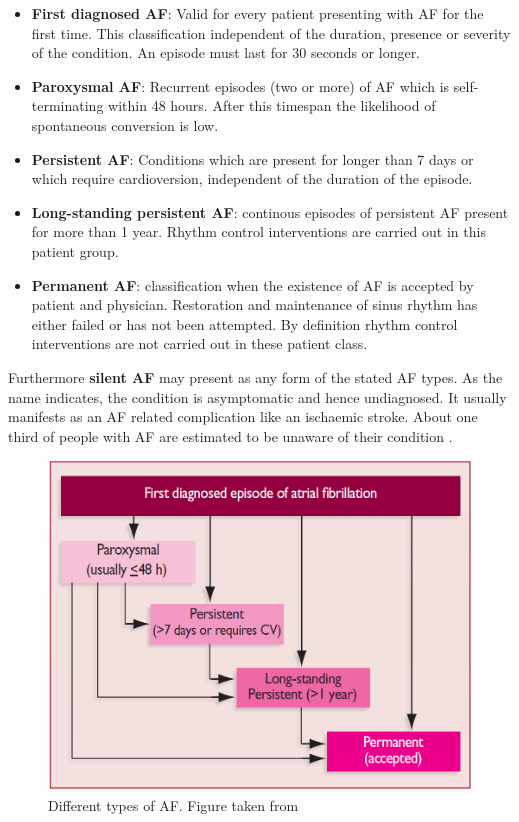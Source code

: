 \documentclass[type=dr, dr=rernat, accentcolor=tud7b,colorbacktitle, bigchapter, openright, twoside, 12pt ]{tudthesis}
\begin{document}
\begin{itemize} 
 \item[] \textbf{First diagnosed AF}: Valid for every patient presenting with AF for the first time. This classification independent of the 
 duration, presence or severity of the condition. An episode must last for 30 seconds or longer.
 \item[] \textbf{Paroxysmal AF}: Recurrent episodes (two or more) of AF which is self-terminating within 48 hours. After this timespan the 
 likelihood of spontaneous conversion is low.
 \item[] \textbf{Persistent AF}: Conditions which are present for longer than 7 days or which require cardioversion, independent of the 
 duration of the episode. 
 \item[] \textbf{Long-standing persistent AF}: continous episodes of persistent AF present for more than 1 year. Rhythm control 
 interventions  are carried out in this patient group. 
 \item[] \textbf{Permanent AF}: classification when the existence of AF is accepted by patient and physician. Restoration and maintenance
 of sinus rhythm has either failed or has not been attempted. By definition rhythm control interventions are not carried out in these 
 patient class.  
\end{itemize}

Furthermore \textbf{silent AF} may present as any form of the stated AF types. As the name indicates, the condition is asymptomatic and 
hence undiagnosed. It usually manifests as an AF related complication like an ischaemic stroke. About one third of people with AF are 
estimated to be unaware of their condition \cite{ESC10}.

\begin{figure}[H]
\begin{center}
\includegraphics[scale=0.25]{af_types.png}
\caption{Different types of AF. Figure taken from \cite{ESC10}}
\label{ecg}
\end{center}
\end{figure}
\end{document}
